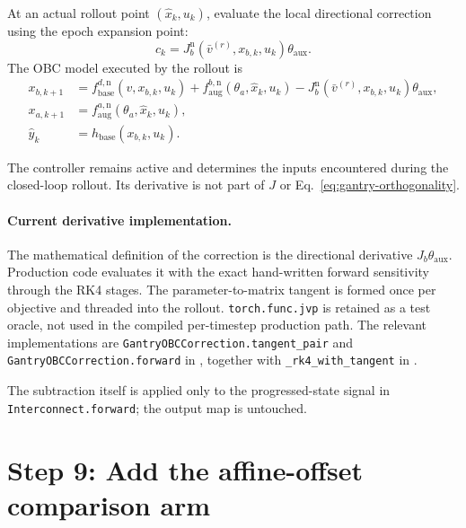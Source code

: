 \documentclass[11pt,a4paper]{article}
\newcommand{\code}[1]{\texttt{#1}}
\begin{document}
At an actual rollout point \((\widehat x_k,u_k)\), evaluate the local
directional correction using the epoch expansion point:
\begin{equation}
c_k
=J_b^{\mathrm n}(\bar v^{(r)},x_{b,k},u_k)
\theta_{\mathrm{aux}}.
\end{equation}
The OBC model executed by the rollout is
\begin{equation}
\boxed{
\begin{aligned}
x_{b,k+1}
&=f_{\mathrm{base}}^{d,\mathrm n}(v,x_{b,k},u_k)
 +f_{\mathrm{aug}}^{b,\mathrm n}(\theta_a,\widehat x_k,u_k)
 -J_b^{\mathrm n}(\bar v^{(r)},x_{b,k},u_k)\theta_{\mathrm{aux}},\\
x_{a,k+1}
&=f_{\mathrm{aug}}^{a,\mathrm n}(\theta_a,\widehat x_k,u_k),\\
\widehat y_k
&=h_{\mathrm{base}}(x_{b,k},u_k).
\end{aligned}}
\label{eq:corrected-rollout}
\end{equation}

The controller remains active and determines the inputs encountered during the
closed-loop rollout.  Its derivative is not part of \(J\) or
Eq.~\eqref{eq:gantry-orthogonality}.

\paragraph{Current derivative implementation.}
The mathematical definition of the correction is the directional derivative
\(J_b\theta_{\mathrm{aux}}\).  Production code evaluates it with the exact
hand-written forward sensitivity through the RK4 stages.  The
parameter-to-matrix tangent is formed once per objective and threaded into the
rollout.  \code{torch.func.jvp} is retained as a test oracle, not used in the
compiled per-timestep production path.  The relevant implementations are
\code{GantryOBCCorrection.tangent\_pair} and
\code{GantryOBCCorrection.forward} in
, together with
\code{\_rk4\_with\_tangent} in
.

The subtraction itself is applied only to the progressed-state signal in
\code{Interconnect.forward}; the output map is untouched.

\clearpage
\section{Step 9: Add the affine-offset comparison arm}
\end{document}
